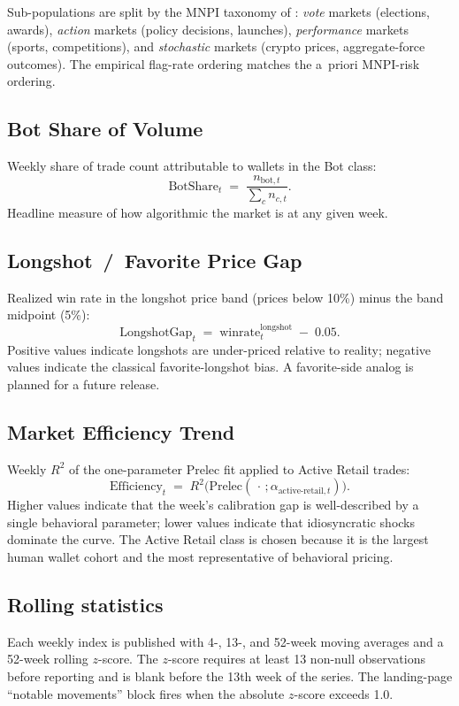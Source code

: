 \documentclass[11pt,letterpaper]{article}
\begin{document}
Sub-populations are split by the MNPI taxonomy of \citet{dellavedova2026orthogonality}: \emph{vote} markets (elections, awards), \emph{action} markets (policy decisions, launches), \emph{performance} markets (sports, competitions), and \emph{stochastic} markets (crypto prices, aggregate-force outcomes). The empirical flag-rate ordering matches the a~priori MNPI-risk ordering.

\subsection{Bot Share of Volume}
\label{sub:botshare}

Weekly share of trade count attributable to wallets in the Bot class:
\[
  \mathrm{BotShare}_t \;=\; \frac{n_{\mathrm{bot}, t}}{\sum_c n_{c,t}}.
\]
Headline measure of how algorithmic the market is at any given week.

\subsection{Longshot~/~Favorite Price Gap}
\label{sub:pricegap}

Realized win rate in the longshot price band (prices below 10\%) minus the band midpoint (5\%):
\[
  \mathrm{LongshotGap}_t \;=\; \mathrm{winrate}^{\mathrm{longshot}}_t \;-\; 0.05.
\]
Positive values indicate longshots are under-priced relative to reality; negative values indicate the classical favorite-longshot bias. A favorite-side analog is planned for a future release.

\subsection{Market Efficiency Trend}
\label{sub:efficiency}

Weekly $R^2$ of the one-parameter Prelec fit applied to Active Retail trades:
\[
  \mathrm{Efficiency}_t \;=\; R^2\!\big(\mathrm{Prelec}(\,\cdot\,; \alpha_{\mathrm{active\text{-}retail},t})\big).
\]
Higher values indicate that the week's calibration gap is well-described by a single behavioral parameter; lower values indicate that idiosyncratic shocks dominate the curve. The Active Retail class is chosen because it is the largest human wallet cohort and the most representative of behavioral pricing.

\subsection{Rolling statistics}
Each weekly index is published with 4-, 13-, and 52-week moving averages and a 52-week rolling $z$-score. The $z$-score requires at least 13 non-null observations before reporting and is blank before the 13th week of the series. The landing-page ``notable movements'' block fires when the absolute $z$-score exceeds 1.0.
\end{document}
